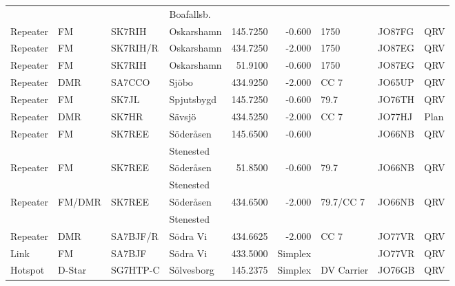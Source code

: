 \begin{longtable}{llllrrlll}
         &                 &          & Boafallsb.   &              &            &              &             &          \\
Repeater & FM              & SK7RIH   & Oskarshamn   & 145.7250     & -0.600     & 1750         & JO87FG      & QRV      \\
Repeater & FM              & SK7RIH/R & Oskarshamn   & 434.7250     & -2.000     & 1750         & JO87EG      & QRV      \\
Repeater & FM              & SK7RIH   & Oskarshamn   & 51.9100      & -0.600     & 1750         & JO87EG      & QRV      \\
Repeater & DMR             & SA7CCO   & Sjöbo        & 434.9250     & -2.000     & CC 7         & JO65UP      & QRV      \\
Repeater & FM              & SK7JL    & Spjutsbygd   & 145.7250     & -0.600     & 79.7         & JO76TH      & QRV      \\
Repeater & DMR             & SK7HR    & Sävsjö       & 434.5250     & -2.000     & CC 7         & JO77HJ      & Plan     \\
Repeater & FM              & SK7REE   & Söderåsen    & 145.6500     & -0.600     &              & JO66NB      & QRV      \\
         &                 &          & Stenested    &              &            &              &             &          \\
Repeater & FM              & SK7REE   & Söderåsen    & 51.8500      & -0.600     & 79.7         & JO66NB      & QRV      \\
         &                 &          & Stenested    &              &            &              &             &          \\
Repeater & FM/DMR          & SK7REE   & Söderåsen    & 434.6500     & -2.000     & 79.7/CC 7    & JO66NB      & QRV      \\
         &                 &          & Stenested    &              &            &              &             &          \\
Repeater & DMR             & SA7BJF/R & Södra Vi     & 434.6625     & -2.000     & CC 7         & JO77VR      & QRV      \\
Link     & FM              & SA7BJF   & Södra Vi     & 433.5000     & Simplex    &              & JO77VR      & QRV      \\
Hotspot  & D-Star          & SG7HTP-C & Sölvesborg   & 145.2375     & Simplex    & DV Carrier   & JO76GB      & QRV      \\

\end{longtable}
